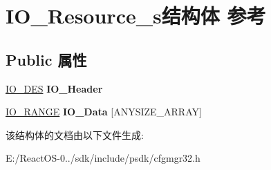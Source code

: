 \hypertarget{struct_i_o___resource__s}{}\section{I\+O\+\_\+\+Resource\+\_\+s结构体 参考}
\label{struct_i_o___resource__s}
\subsection*{Public 属性}
\begin{DoxyCompactItemize}
\item 
\mbox{\label{struct_i_o___resource__s_a779b991713dc46c7055899f74f515f43}} 
\hyperlink{struct_i_o___des__s}{I\+O\+\_\+\+D\+ES} {\bfseries I\+O\+\_\+\+Header}
\item 
\mbox{\label{struct_i_o___resource__s_a6b7d09fe04aab284286377b9bd6e2f06}} 
\hyperlink{struct_i_o___range__s}{I\+O\+\_\+\+R\+A\+N\+GE} {\bfseries I\+O\+\_\+\+Data} \mbox{[}A\+N\+Y\+S\+I\+Z\+E\+\_\+\+A\+R\+R\+AY\mbox{]}
\end{DoxyCompactItemize}


该结构体的文档由以下文件生成\+:\begin{DoxyCompactItemize}
\item 
E\+:/\+React\+O\+S-\/0../sdk/include/psdk/cfgmgr32.\+h\end{DoxyCompactItemize}
